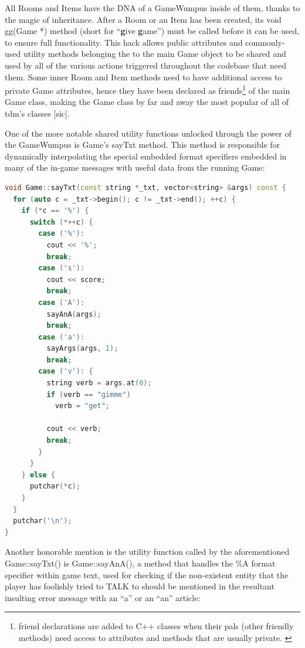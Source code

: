 \documentclass[man,12pt]{apa6}
\begin{document}
All \textsf{Room}s and \textsf{Item}s have the DNA of a \textsf{GameWumpus}
inside of them, thanks to the magic of inheritance.  After a \textsf{Room} or an
\textsf{Item} has been created, its \textsf{void gg(Game *)} method (short for
``\textbf{g}ive \textbf{g}ame'') must be called before it can be used, to
ensure full functionality.  This hack allows public attributes and commonly-used
utility methods belonging the to the main \textsf{Game} object to be
shared and used by all of the various actions triggered throughout the
codebase that need them.  Some inner \textsf{Room} and \textsf{Item} methods
need to have additional access to \textsf{private} \textsf{Game} attributes,
hence they have been declared as \textsf{friend}s\footnote{\textsf{friend} declarations are
added to C++ classes when their pals (other friendly methods) need access to
attributes and methods that are usually private. \parencite{friend-cpp}} of the
main \textsf{Game} class, making the \textsf{Game} class by far and away the
most popular of all of \textsf{tdm}'s classes [sic].

One of the more notable shared utility functions unlocked through the power of
the \textsf{GameWumpus} is \textsf{Game}'s \textsf{sayTxt} method.  This method
is responsible for dynamically interpolating the special embedded format
specifiers embedded in many of the in-game messages with useful data from the
running \textsf{Game}:

\begin{framed}
\begin{lstlisting}[language=C++]
void Game::sayTxt(const string *_txt, vector<string> &args) const {
  for (auto c = _txt->begin(); c != _txt->end(); ++c) {
    if (*c == '%') {
      switch (*++c) {
        case ('%'):
          cout << '%';
          break;
        case ('s'):
          cout << score;
          break;
        case ('A'):
          sayAnA(args);
          break;
        case ('a'):
          sayArgs(args, 1);
          break;
        case ('v'): {
          string verb = args.at(0);
          if (verb == "gimme")
            verb = "get";

          cout << verb;
          break;
        }
      }
    } else {
      putchar(*c);
    }
  }
  putchar('\n');
}
\end{lstlisting}
\end{framed}

Another honorable mention is the utility function called by the aforementioned
\textsf{Game::sayTxt()} is \textsf{Game::sayAnA()}, a method that handles
the \textsf{\%A} format specifier within game text, used for checking if the
non-existent entity that the player has foolishly tried to \textsf{TALK} to
should be mentioned in
the resultant insulting error message with an ``a'' or an ``an'' article:
\end{document}
